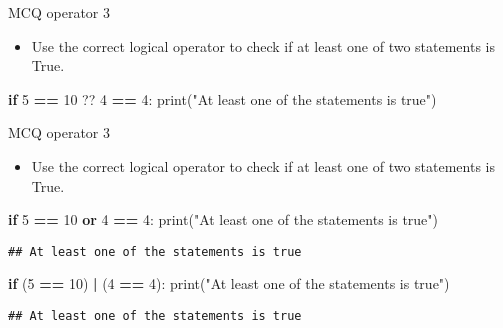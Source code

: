 \documentclass[
  8pt,
  ignorenonframetext,
]{beamer}
\newenvironment{Shaded}{\begin{snugshade}}{\end{snugshade}}
\newcommand{\BuiltInTok}[1]{#1}
\newcommand{\ControlFlowTok}[1]{\textcolor[rgb]{0.13,0.29,0.53}{\textbf{#1}}}
\newcommand{\DecValTok}[1]{\textcolor[rgb]{0.00,0.00,0.81}{#1}}
\newcommand{\KeywordTok}[1]{\textcolor[rgb]{0.13,0.29,0.53}{\textbf{#1}}}
\newcommand{\NormalTok}[1]{#1}
\newcommand{\OperatorTok}[1]{\textcolor[rgb]{0.81,0.36,0.00}{\textbf{#1}}}
\newcommand{\StringTok}[1]{\textcolor[rgb]{0.31,0.60,0.02}{#1}}
\providecommand{\tightlist}{%
  \setlength{\itemsep}{0pt}\setlength{\parskip}{0pt}}
\begin{document}
\begin{frame}[fragile]{MCQ operator 3}
\protect\hypertarget{mcq-operator-3}{}
\begin{itemize}
\tightlist
\item
  Use the correct logical operator to check if at least one of two
  statements is True.
\end{itemize}

\begin{Shaded}
\begin{Highlighting}[]
\ControlFlowTok{if} \DecValTok{5} \OperatorTok{==} \DecValTok{10}\NormalTok{ ?? }\DecValTok{4} \OperatorTok{==} \DecValTok{4}\NormalTok{:}
  \BuiltInTok{print}\NormalTok{(}\StringTok{"At least one of the statements is true"}\NormalTok{)}
\end{Highlighting}
\end{Shaded}
\end{frame}

\begin{frame}[fragile]{MCQ operator 3}
\protect\hypertarget{mcq-operator-3-1}{}
\begin{itemize}
\tightlist
\item
  Use the correct logical operator to check if at least one of two
  statements is True.
\end{itemize}

\begin{Shaded}
\begin{Highlighting}[]
\ControlFlowTok{if} \DecValTok{5} \OperatorTok{==} \DecValTok{10} \KeywordTok{or} \DecValTok{4} \OperatorTok{==} \DecValTok{4}\NormalTok{:}
  \BuiltInTok{print}\NormalTok{(}\StringTok{"At least one of the statements is true"}\NormalTok{)}
  
\end{Highlighting}
\end{Shaded}

\begin{verbatim}
## At least one of the statements is true
\end{verbatim}

\begin{Shaded}
\begin{Highlighting}[]
\ControlFlowTok{if}\NormalTok{ (}\DecValTok{5} \OperatorTok{==} \DecValTok{10}\NormalTok{) }\OperatorTok{|}\NormalTok{ (}\DecValTok{4} \OperatorTok{==} \DecValTok{4}\NormalTok{):}
  \BuiltInTok{print}\NormalTok{(}\StringTok{"At least one of the statements is true"}\NormalTok{)}
\end{Highlighting}
\end{Shaded}

\begin{verbatim}
## At least one of the statements is true
\end{verbatim}
\end{frame}
\end{document}
